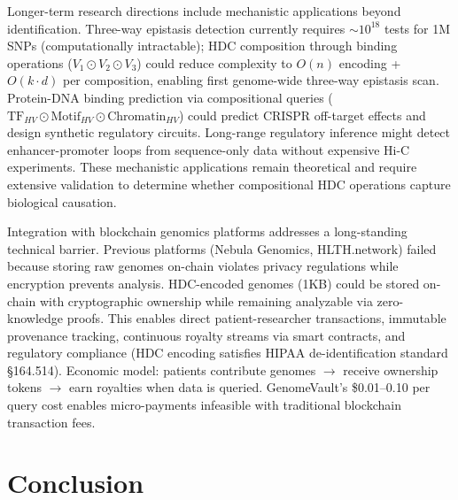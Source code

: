 \documentclass[11pt,letterpaper]{article}
\begin{document}
Longer-term research directions include mechanistic applications beyond identification. Three-way epistasis detection currently requires $\sim 10^{18}$ tests for 1M SNPs (computationally intractable); HDC composition through binding operations ($V_1 \odot V_2 \odot V_3$) could reduce complexity to $O(n)$ encoding + $O(k \cdot d)$ per composition, enabling first genome-wide three-way epistasis scan. Protein-DNA binding prediction via compositional queries ($\text{TF}_{HV} \odot \text{Motif}_{HV} \odot \text{Chromatin}_{HV}$) could predict CRISPR off-target effects and design synthetic regulatory circuits. Long-range regulatory inference might detect enhancer-promoter loops from sequence-only data without expensive Hi-C experiments. These mechanistic applications remain theoretical and require extensive validation to determine whether compositional HDC operations capture biological causation.

Integration with blockchain genomics platforms addresses a long-standing technical barrier. Previous platforms (Nebula Genomics, HLTH.network) failed because storing raw genomes on-chain violates privacy regulations while encryption prevents analysis. HDC-encoded genomes (1KB) could be stored on-chain with cryptographic ownership while remaining analyzable via zero-knowledge proofs. This enables direct patient-researcher transactions, immutable provenance tracking, continuous royalty streams via smart contracts, and regulatory compliance (HDC encoding satisfies HIPAA de-identification standard \S164.514). Economic model: patients contribute genomes $\rightarrow$ receive ownership tokens $\rightarrow$ earn royalties when data is queried. GenomeVault's \$0.01--0.10 per query cost enables micro-payments infeasible with traditional blockchain transaction fees.

\section{Conclusion}
\end{document}

